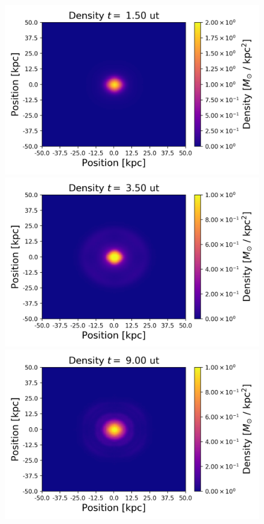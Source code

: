 {\begin{figure}[h!]
    \centering
    \includegraphics[scale=0.45]{imag/2dDens3.png}
    \includegraphics[scale=0.45]{imag/2dDens7.png}
    \includegraphics[scale=0.45]{imag/2dDens18.png}

\end{figure}}
